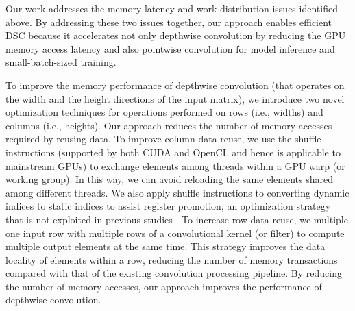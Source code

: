 Our work addresses the memory latency and work distribution issues identified above. By addressing these two issues together, our approach
enables efficient DSC because it accelerates not only depthwise convolution by reducing the GPU memory access latency and also pointwise
convolution for model inference and small-batch-sized training.


To improve the memory performance of depthwise convolution (that operates on the width and the height directions of the input matrix), we
introduce two novel optimization techniques for operations performed on rows (i.e., widths) and columns (i.e., heights). Our approach
reduces the number of memory accesses required by reusing data. To improve column data reuse, we use the shuffle instructions (supported by
both CUDA and OpenCL and hence is applicable to mainstream GPUs) to exchange elements among threads within a GPU warp (or working group).
In this way, we can avoid reloading the same elements shared among different threads. We also apply shuffle instructions to converting
dynamic indices to static indices to assist register promotion, an optimization strategy that is not exploited in previous studies
\cite{vasilache2014fast}. To increase row data reuse, we multiple one input row with multiple rows of a convolutional kernel (or filter) to
compute multiple output elements at the same time. This strategy improves the data locality of elements within a row, reducing the number
of memory transactions compared with that of the existing convolution processing pipeline. By reducing the number of memory accesses, our
approach improves the performance of depthwise convolution.

